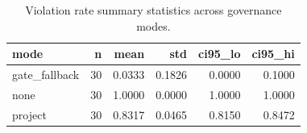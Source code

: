 \begin{table}
\caption{Violation rate summary statistics across governance modes.}
\label{tab:violation_summary}
\begin{tabular}{lrrrrr}
\toprule
mode & n & mean & std & ci95_lo & ci95_hi \\
\midrule
gate_fallback & 30 & 0.0333 & 0.1826 & 0.0000 & 0.1000 \\
none & 30 & 1.0000 & 0.0000 & 1.0000 & 1.0000 \\
project & 30 & 0.8317 & 0.0465 & 0.8150 & 0.8472 \\
\bottomrule
\end{tabular}
\end{table}
